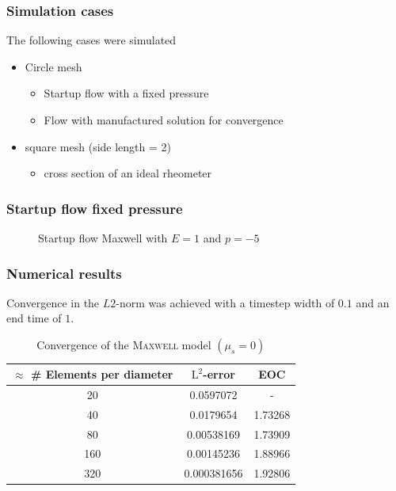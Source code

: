 \documentclass[12pt,a4paper]{beamer}
\theoremstyle{definition}
\theoremstyle{plain}
\begin{document}
\begin{frame}
    \frametitle{Simulation cases}
    The following cases were simulated
    \begin{itemize}[<+->]
        \item Circle mesh 
        \begin{itemize}[<+->]
            \item Startup flow with a fixed pressure 
            \item Flow with manufactured solution for convergence
        \end{itemize}
        \item square mesh (side length = 2)
        \begin{itemize}[<+->]
            \item cross section of an ideal rheometer
        \end{itemize}
    \end{itemize}
\end{frame}
\begin{frame}
    \frametitle{Startup flow fixed pressure}
    \begin{figure}
        \caption{Startup flow Maxwell with $E=1$ and $p=-5$}
    \end{figure}
\end{frame}
\begin{frame}
    \frametitle{Numerical results}
    Convergence in the $L2$-norm was achieved with a timestep width of $0.1$ and an end time of $1$.
    \begin{table}
        \centering
        \begin{tabular}{c|c|c}
            $\approx$ \# Elements per diameter& $\mathrm{L}^2$-error&EOC\\
            \hline
            20 & 0.0597072 & -\\
            40 & 0.0179654 & 1.73268\\
            80 & 0.00538169 & 1.73909\\
            160 & 0.00145236 & 1.88966\\
            320 & 0.000381656 & 1.92806
        \end{tabular}
        \caption{Convergence of the \textsc{Maxwell} model $(\mu_s=0)$}
    \end{table}
\end{frame}
\end{document}
